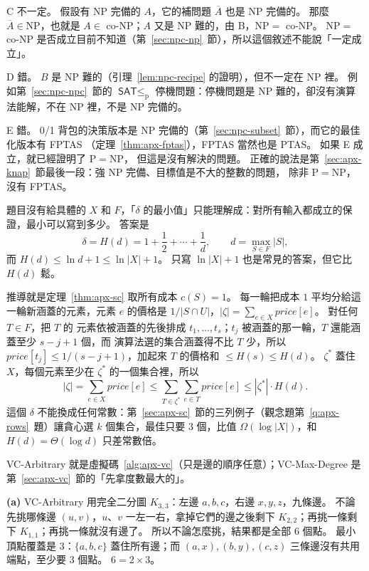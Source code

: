 C 不一定。 假設有 NP 完備的 $A$，它的補問題 $\overline{A}$ 也是 NP 完備的。 那麼 $\overline{A} \in
\mathrm{NP}$，也就是 $A \in$ co-NP；$A$ 又是 NP 難的，由 B，$\mathrm{NP} =$ co-NP。 $\mathrm{NP} =$ co-NP
是否成立目前不知道（第~\ref{sec:npc-np}~節），所以這個敘述不能說「一定成立」。

D 錯。 $B$ 是 NP 難的（引理~\ref{lem:npc-recipe} 的證明），但不一定在 NP 裡。 例如第~\ref{sec:npc-npc}~節的
$\textsf{SAT} \le_{\mathrm{p}}$ 停機問題：停機問題是 NP 難的，卻沒有演算法能解，不在 NP 裡，不是 NP 完備的。

E 錯。 0/1 背包的決策版本是 NP 完備的（第~\ref{sec:npc-subset}~節），而它的最佳化版本有 FPTAS
（定理~\ref{thm:apx-fptas}），FPTAS 當然也是 PTAS。 如果 E 成立，就已經證明了 $\mathrm{P} = \mathrm{NP}$，
但這是沒有解決的問題。 正確的說法是第~\ref{sec:apx-knap}~節最後一段：強 NP 完備、目標值是不大的整數的問題，
除非 $\mathrm{P} = \mathrm{NP}$，沒有 FPTAS。

題目沒有給具體的 $X$ 和 $F$，「$\delta$ 的最小值」只能理解成：對所有輸入都成立的保證，最小可以寫到多少。
答案是
\[
\delta = H(d) = 1 + \frac12 + \cdots + \frac1d, \qquad d = \max_{S \in F} |S|,
\]
而 $H(d) \le \ln d + 1 \le \ln |X| + 1$。 只寫 $\ln |X| + 1$ 也是常見的答案，但它比 $H(d)$ 鬆。

推導就是定理~\ref{thm:apx-sc} 取所有成本 $c(S) = 1$。 每一輪把成本 $1$ 平均分給這一輪新涵蓋的元素，元素
$e$ 的價格是 $1/|S \cap U|$，$|\zeta| = \sum_{e \in X} \mathit{price}[e]$。 對任何 $T \in F$，把 $T$ 的
元素依被涵蓋的先後排成 $t_1, \ldots, t_s$；$t_j$ 被涵蓋的那一輪，$T$ 還能涵蓋至少 $s - j + 1$ 個，而
演算法選的集合涵蓋得不比 $T$ 少，所以 $\mathit{price}[t_j] \le 1/(s - j + 1)$，加起來 $T$ 的價格和
$\le H(s) \le H(d)$。 $\zeta^*$ 蓋住 $X$，每個元素至少在 $\zeta^*$ 的一個集合裡，所以
\[
|\zeta| = \sum_{e \in X} \mathit{price}[e] \le \sum_{T \in \zeta^*} \sum_{e \in T} \mathit{price}[e]
\le |\zeta^*| \cdot H(d).
\]
這個 $\delta$ 不能換成任何常數：第~\ref{sec:apx-sc}~節的三列例子（觀念題第~\ref{q:apx-rows}~題）讓貪心選
$k$ 個集合，最佳只要 $3$ 個，比值 $\Omega(\log |X|)$，和 $H(d) = \Theta(\log d)$ 只差常數倍。

VC-Arbitrary 就是虛擬碼~\ref{alg:apx-vc}（只是邊的順序任意）；VC-Max-Degree 是
第~\ref{sec:apx-vc}~節的「先拿度數最大的」。

\textbf{(a)} VC-Arbitrary 用完全二分圖 $K_{3,3}$：左邊 $a, b, c$，右邊 $x, y, z$，九條邊。 不論先挑哪條邊
$(u, v)$，$u$、$v$ 一左一右，拿掉它們的邊之後剩下 $K_{2,2}$；再挑一條剩下 $K_{1,1}$；再挑一條就沒有邊了。
所以不論怎麼挑，結果都是全部 $6$ 個點。 最小頂點覆蓋是 $3$：$\{a, b, c\}$ 蓋住所有邊；而
$(a, x), (b, y), (c, z)$ 三條邊沒有共用端點，至少要 $3$ 個點。 $6 = 2 \times 3$。

